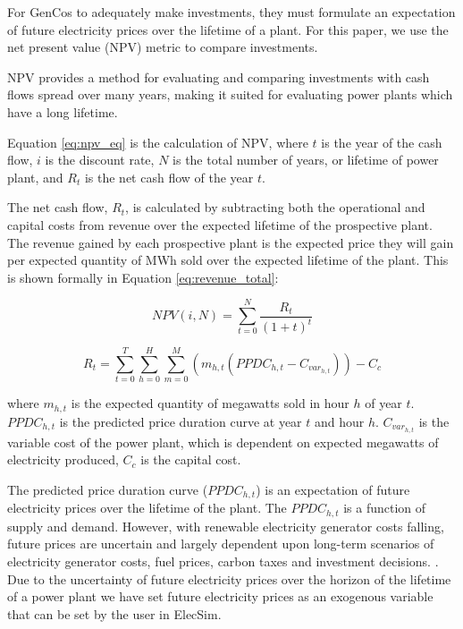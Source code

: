 For GenCos to adequately make investments, they must formulate an expectation of future electricity prices over the lifetime of a plant. For this paper, we use the net present value (NPV) metric to compare investments. 


NPV provides a method for evaluating and comparing investments with cash flows spread over many years, making it suited for evaluating power plants which have a long lifetime.  

Equation \ref{eq:npv_eq} is the calculation of NPV, where $t$ is the year of the cash flow, $i$ is the discount rate, $N$ is the total number of years, or lifetime of power plant, and $R_t$ is the net cash flow of the year $t$.

The net cash flow, $R_t$, is calculated by subtracting both the operational and capital costs from revenue over the expected lifetime of the prospective plant. The revenue gained by each prospective plant is the expected price they will gain per expected quantity of MWh sold over the expected lifetime of the plant. This is shown formally in Equation \ref{eq:revenue_total}:

\begin{equation} \label{eq:npv_eq}
NPV(i, N) = \sum_{t=0}^{N}\frac{R_t}{(1+t)^t}
\end{equation}




\begin{equation}
\label{eq:revenue_total}
R_t = 
\sum\limits_{t=0}^T 
\sum\limits_{h=0}^H
\sum\limits_{m=0}^M \left(
m_{h,t}(PPDC_{h,t}
-
C_{var_{h,t}})\right)
- C_c
\end{equation}

\noindent where $m_{h,t}$ is the expected quantity of megawatts sold in hour $h$ of year $t$. $PPDC_{h,t}$ is the predicted price duration curve at year $t$ and hour $h$. $C_{var_{h,t}}$ is the variable cost of the power plant, which is dependent on expected megawatts of electricity produced, $C_c$ is the capital cost.

The predicted price duration curve ($PPDC_{h,t}$) is an expectation of future electricity prices over the lifetime of the plant. The $PPDC_{h,t}$ is a function of supply and demand. However, with renewable electricity generator costs falling, future prices are uncertain and largely dependent upon long-term scenarios of electricity generator costs, fuel prices, carbon taxes and investment decisions. \cite{IRENA2014}. Due to the uncertainty of future electricity prices over the horizon of the lifetime of a power plant we have set future electricity prices as an exogenous variable that can be set by the user in ElecSim. 


